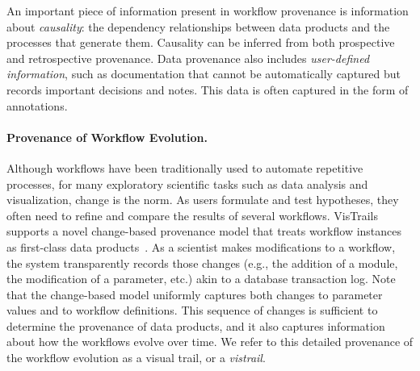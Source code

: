 \documentclass[12pt]{iopart}
\makeatletter
\newcommand{\eg}{e.g.,\xspace}
\newcommand{\etc}{etc.\@\xspace}
\makeatother
\begin{document}
An important piece of information present in workflow provenance is
information about \emph{causality}: the dependency relationships
between data products and the processes that generate them.  Causality
can be inferred from both prospective and retrospective provenance.
Data provenance also includes \emph{user-defined information}, such as
documentation that cannot be automatically captured but records
important decisions and notes.  This data is often captured in the
form of annotations.

\paragraph{Provenance of Workflow Evolution.}
%
Although workflows have been traditionally used to automate repetitive
processes, for many exploratory scientific tasks such as data analysis
and visualization, change is the norm. As users formulate and test
hypotheses, they often need to refine and compare the results of
several workflows. VisTrails~\cite{vistrails} supports a novel
change-based provenance model that treats workflow instances as
first-class data
products~\cite{Freire:2006:IPAW,callahan@sciflow2006}.  As a scientist
makes modifications to a workflow, the system transparently records
those changes (\eg the addition of a module, the modification of a
parameter, \etc) akin to a database transaction log. Note that the
change-based model uniformly captures both changes to parameter values
and to workflow definitions. This sequence of changes is sufficient to
determine the provenance of data products, and it also captures
information about how the workflows evolve over time.  We refer to
this detailed provenance of the workflow evolution as a visual trail,
or a \emph{vistrail}.
\end{document}
